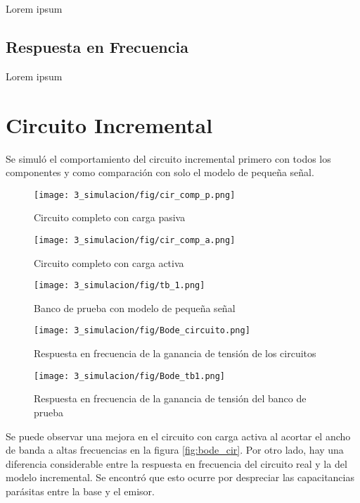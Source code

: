 Lorem ipsum
\subsection{Respuesta en Frecuencia}
Lorem ipsum
\newpage
\section{Circuito Incremental}
Se simuló el comportamiento del circuito incremental primero con todos los componentes y como comparación con solo el modelo de pequeña señal.

\begin{figure}[ht]
    \begin{minipage}[t]{0.45\textwidth}
        \centering
        \texttt{[image: 3\_simulacion/fig/cir\_comp\_p.png]}
        \caption{Circuito completo con carga pasiva}
    \end{minipage}\hfill
    \begin{minipage}[t]{0.45\textwidth}
        \centering
        \texttt{[image: 3\_simulacion/fig/cir\_comp\_a.png]}
        \caption{Circuito completo con carga activa}
    \end{minipage}
\end{figure}

\begin{figure}[ht]
    \centering
    \texttt{[image: 3\_simulacion/fig/tb\_1.png]}
    \caption{Banco de prueba con modelo de pequeña señal}
\end{figure}

\begin{figure}[ht]
    \begin{minipage}[t]{0.48\textwidth}
        \centering
        \texttt{[image: 3\_simulacion/fig/Bode\_circuito.png]}
        \caption{Respuesta en frecuencia de la ganancia de tensión de los circuitos}
        \label{fig:bode_cir}
    \end{minipage}\hfill
    \begin{minipage}[t]{0.48\textwidth}
        \centering
        \texttt{[image: 3\_simulacion/fig/Bode\_tb1.png]}
        \caption{Respuesta en frecuencia de la ganancia de tensión del banco de prueba}
        \label{fig:bode_tb1}
    \end{minipage}
\end{figure}

Se puede observar una mejora en el circuito con carga activa al acortar el ancho de banda a altas frecuencias en la figura \ref{fig:bode_cir}. Por otro lado, hay una diferencia considerable entre la respuesta en frecuencia del circuito real y la del modelo incremental. Se encontró que esto ocurre por despreciar las capacitancias parásitas entre la base y el emisor.

